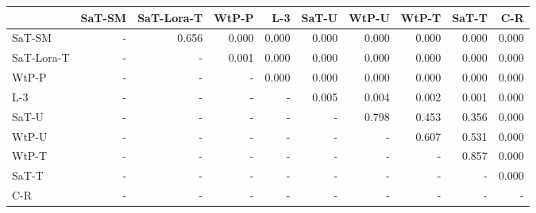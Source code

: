\begin{tabular}{lrrrrrrrrr}
\toprule
 & SaT-SM & SaT-Lora-T & WtP-P & L-3 & SaT-U & WtP-U & WtP-T & SaT-T & C-R \\
\midrule
SaT-SM & - & 0.656 & 0.000 & 0.000 & 0.000 & 0.000 & 0.000 & 0.000 & 0.000 \\
SaT-Lora-T & - & - & 0.001 & 0.000 & 0.000 & 0.000 & 0.000 & 0.000 & 0.000 \\
WtP-P & - & - & - & 0.000 & 0.000 & 0.000 & 0.000 & 0.000 & 0.000 \\
L-3 & - & - & - & - & 0.005 & 0.004 & 0.002 & 0.001 & 0.000 \\
SaT-U & - & - & - & - & - & 0.798 & 0.453 & 0.356 & 0.000 \\
WtP-U & - & - & - & - & - & - & 0.607 & 0.531 & 0.000 \\
WtP-T & - & - & - & - & - & - & - & 0.857 & 0.000 \\
SaT-T & - & - & - & - & - & - & - & - & 0.000 \\
C-R & - & - & - & - & - & - & - & - & - \\
\bottomrule
\end{tabular}

